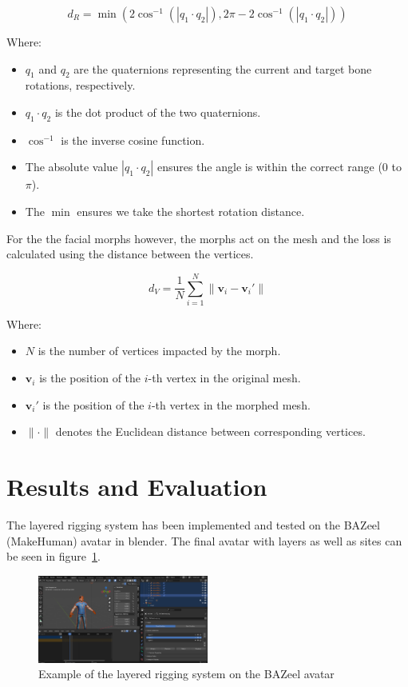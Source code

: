 \documentclass[../../main.tex]{subfiles}
\begin{document}
\[
d_R = \min\left( 2 \cos^{-1}\left( \left| q_1 \cdot q_2 \right| \right), 2\pi - 2 \cos^{-1}\left( \left| q_1 \cdot q_2 \right| \right) \right)
\]

Where:
\begin{itemize}
    \item \( q_1 \) and \( q_2 \) are the quaternions representing the current and target bone rotations, respectively.
    \item \( q_1 \cdot q_2 \) is the dot product of the two quaternions.
    \item \( \cos^{-1} \) is the inverse cosine function.
    \item The absolute value \( | q_1 \cdot q_2 | \) ensures the angle is within the correct range (0 to \( \pi \)).
    \item The \( \min \) ensures we take the shortest rotation distance.
\end{itemize}

For the the facial morphs however, the morphs act on the mesh and the loss is calculated using the distance between the vertices.

\[
d_V = \frac{1}{N} \sum_{i=1}^{N} \| \mathbf{v}_i - \mathbf{v}_i' \|
\]

Where:
\begin{itemize}
    \item \( N \) is the number of vertices impacted by the morph.
    \item \( \mathbf{v}_i \) is the position of the \( i \)-th vertex in the original mesh.
    \item \( \mathbf{v}_i' \) is the position of the \( i \)-th vertex in the morphed mesh.
    \item \( \|\cdot\| \) denotes the Euclidean distance between corresponding vertices.
\end{itemize}

\section{Results and Evaluation}
\label{ch:avatar_creation_pose_synthesis:results}

The layered rigging system has been implemented and tested on the BAZeel (MakeHuman) avatar in blender. The final avatar with layers as well as sites can be seen in figure~\ref{fig:layers_example}.

\begin{figure}
    \centering
    \includegraphics[width=0.5\textwidth]{chapters/avatar_creation_pose_synthesis/images/layers_example.png}
    \caption{Example of the layered rigging system on the BAZeel avatar}
    \label{fig:layers_example}
\end{figure}
\end{document}
